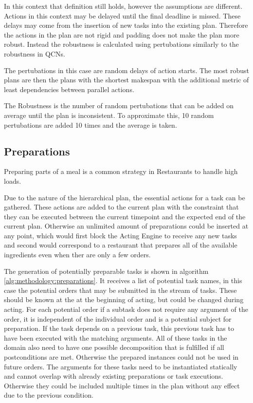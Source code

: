 In this context that definition still holds, however the assumptions are different.
Actions in this context may be delayed until the final deadline is missed.
These delays may come from the insertion of new tasks into the existing plan.
Therefore the actions in the plan are not rigid and padding does not make the plan more robust.
Instead the robustness is calculated using pertubations similarly to the robustness in QCNs.

The pertubations in this case are random delays of action starts.
The most robust plans are then the plans with the shortest makespan with the additional metric of least dependencies between parallel actions.


The Robustness is the number of random pertubations that can be added on average until the plan is inconsistent.
To approximate this, 10 random pertubations are added 10 times and the average is taken.


\subsection{Preparations}

Preparing parts of a meal is a common strategy in Restaurants to handle high loads.

Due to the nature of the hierarchical plan, the essential actions for a task can be gathered.
These actions are added to the current plan with the constraint that they can be executed between the current timepoint and the expected end of the current plan.
Otherwise an unlimited amount of preparations could be inserted at any point, which would first block the Acting Engine to receive any new tasks and second would correspond to a restaurant that prepares all of the available ingredients even when ther are only a few orders.

The generation of potentially preparable tasks is shown in algorithm \ref{alg:methodology:preparations}.
It receives a list of potential task names, in this case the potential orders that may be submitted in the stream of tasks.
These should be known at the at the beginning of acting, but could be changed during acting.
For each potential order if a subtask does not require any argument of the order, it is independent of the individual order and is a potential subject for preparation.
If the task depends on a previous task, this previous task has to have been executed with the matching arguments.
All of these tasks in the domain also need to have one possible decomposition that is fulfilled if all postconditions are met.
Otherwise the prepared instances could not be used in future orders.
The arguments for these tasks need to be instantiated statically and cannot overlap with already existing preparations or task executions.
Otherwise they could be included multiple times in the plan without any effect due to the previous condition.


